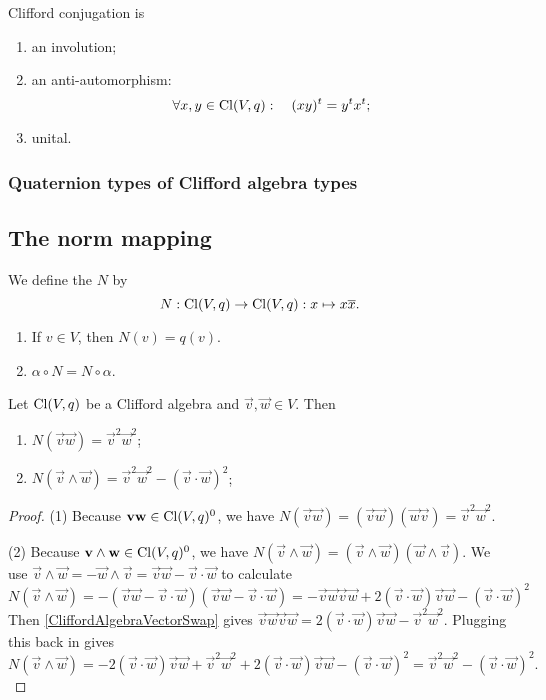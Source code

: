 \begin{lemma}
Clifford conjugation is
\begin{enumerate}
\item an involution;
\item an anti-automorphism:
\[ \forall x,y\in \operatorname{Cl}(V,q): \quad (xy)^t = y^tx^t; \]
\item unital.
\end{enumerate}
\end{lemma}

\subsubsection{Quaternion types of Clifford algebra types}

\subsection{The norm mapping}
\begin{definition}
We define the  $N$ by
\[ N: \operatorname{Cl}(V,q)\to \operatorname{Cl}(V,q): x\mapsto x \overline{x}. \]
\end{definition}
\begin{lemma} \label{normIsQuadraticForm}
\begin{enumerate}
\item If $v\in V$, then $N(v) = q(v)$.
\item $\alpha\circ N = N\circ \alpha$.
\end{enumerate}
\end{lemma}

\begin{proposition}
Let $\operatorname{Cl}(V,q)$ be a Clifford algebra and $\vec{v},\vec{w}\in V$. Then
\begin{enumerate}
\item $N(\vec{v}\vec{w}) = \vec{v}^2 \vec{w}^2$;
\item $N(\vec{v}\wedge \vec{w}) = \vec{v}^2\vec{w}^2 - (\vec{v}\cdot \vec{w})^2$;
\end{enumerate}
\end{proposition}
\begin{proof}
(1) Because $\boldsymbol{\mathrm{v}}\boldsymbol{\mathrm{w}}\in\operatorname{Cl}(V,q)^0$, we have $N(\vec{v}\vec{w}) = (\vec{v}\vec{w})(\vec{w}\vec{v}) = \vec{v}^2 \vec{w}^2$.

(2) Because $\boldsymbol{\mathrm{v}}\wedge \boldsymbol{\mathrm{w}}\in\operatorname{Cl}(V,q)^0$, we have $N(\vec{v}\wedge \vec{w}) = (\vec{v}\wedge \vec{w})(\vec{w}\wedge \vec{v})$. We use $\vec{v}\wedge \vec{w} = -\vec{w}\wedge \vec{v} = \vec{v}\vec{w} - \vec{v}\cdot \vec{w}$ to calculate
\[ N(\vec{v}\wedge \vec{w}) = -(\vec{v}\vec{w} - \vec{v}\cdot \vec{w})(\vec{v}\vec{w} - \vec{v}\cdot \vec{w}) = -\vec{v}\vec{w}\vec{v}\vec{w} + 2(\vec{v}\cdot \vec{w})\vec{v}\vec{w} - (\vec{v}\cdot\vec{w})^2 \]
Then \ref{CliffordAlgebraVectorSwap} gives $\vec{v}\vec{w}\vec{v}\vec{w} = 2 (\vec{v}\cdot \vec{w})\vec{v}\vec{w} - \vec{v}^2 \vec{w}^2$.
Plugging this back in gives
\[ N(\vec{v}\wedge \vec{w}) = -2 (\vec{v}\cdot \vec{w})\vec{v}\vec{w} + \vec{v}^2 \vec{w}^2 + 2(\vec{v}\cdot \vec{w})\vec{v}\vec{w} - (\vec{v}\cdot\vec{w})^2 = \vec{v}^2 \vec{w}^2 - (\vec{v}\cdot\vec{w})^2. \]
\end{proof}


